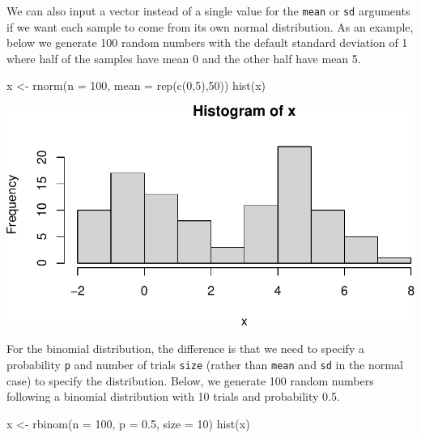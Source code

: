 \documentclass[
  letterpaper,
]{krantz}
\makeatletter
\newenvironment{Shaded}{\begin{snugshade}}{\end{snugshade}}
\newcommand{\AttributeTok}[1]{\textcolor[rgb]{0.40,0.45,0.13}{#1}}
\newcommand{\DecValTok}[1]{\textcolor[rgb]{0.68,0.00,0.00}{#1}}
\newcommand{\FloatTok}[1]{\textcolor[rgb]{0.68,0.00,0.00}{#1}}
\newcommand{\FunctionTok}[1]{\textcolor[rgb]{0.28,0.35,0.67}{#1}}
\newcommand{\NormalTok}[1]{\textcolor[rgb]{0.00,0.23,0.31}{#1}}
\newcommand{\OtherTok}[1]{\textcolor[rgb]{0.00,0.23,0.31}{#1}}
\newenvironment{kframe}{%
\medskip{}
\setlength{\fboxsep}{.8em}
 \def\at@end@of@kframe{}%
 \ifinner\ifhmode%
  \def\at@end@of@kframe{\end{minipage}}%
  \begin{minipage}{\columnwidth}%
 \fi\fi%
 \def\FrameCommand##1{\hskip\@totalleftmargin \hskip-\fboxsep
 \colorbox{shadecolor}{##1}\hskip-\fboxsep
     \hskip-\linewidth \hskip-\@totalleftmargin \hskip\columnwidth}%
 \MakeFramed {\advance\hsize-\width
   \@totalleftmargin\z@ \linewidth\hsize
   \@setminipage}}%
 {\par\unskip\endMakeFramed%
 \at@end@of@kframe}
\renewenvironment{Shaded}{\begin{kframe}}{\end{kframe}}
\makeatother
\begin{document}
We can also input a vector instead of a single value for the
\texttt{mean} or \texttt{sd} arguments if we want each sample to come
from its own normal distribution. As an example, below we generate 100
random numbers with the default standard deviation of 1 where half of
the samples have mean 0 and the other half have mean 5.

\begin{Shaded}
\begin{Highlighting}[]
\NormalTok{x }\OtherTok{\textless{}{-}} \FunctionTok{rnorm}\NormalTok{(}\AttributeTok{n =} \DecValTok{100}\NormalTok{, }\AttributeTok{mean =} \FunctionTok{rep}\NormalTok{(}\FunctionTok{c}\NormalTok{(}\DecValTok{0}\NormalTok{,}\DecValTok{5}\NormalTok{),}\DecValTok{50}\NormalTok{))}
\FunctionTok{hist}\NormalTok{(x)}
\end{Highlighting}
\end{Shaded}

\begin{center}
\includegraphics[width=1\textwidth,height=\textheight]{book/distributions_files/figure-pdf/unnamed-chunk-5-1.pdf}
\end{center}

For the binomial distribution, the difference is that we need to specify
a probability \texttt{p} and number of trials \texttt{size} (rather than
\texttt{mean} and \texttt{sd} in the normal case) to specify the
distribution. Below, we generate 100 random numbers following a binomial
distribution with 10 trials and probability 0.5.

\begin{Shaded}
\begin{Highlighting}[]
\NormalTok{x }\OtherTok{\textless{}{-}} \FunctionTok{rbinom}\NormalTok{(}\AttributeTok{n =} \DecValTok{100}\NormalTok{, }\AttributeTok{p =} \FloatTok{0.5}\NormalTok{, }\AttributeTok{size =} \DecValTok{10}\NormalTok{)}
\FunctionTok{hist}\NormalTok{(x)}
\end{Highlighting}
\end{Shaded}
\end{document}
